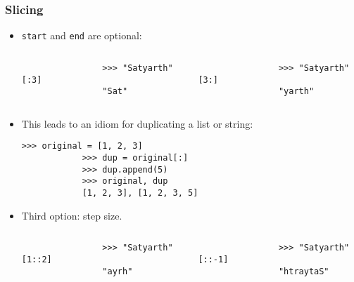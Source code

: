 \documentclass[notes]{beamer}
\begin{document}
	\begin{frame}[fragile]
		\frametitle{Slicing}
		
		\begin{itemize}
			\item \lstinline|start| and \lstinline|end| are optional:
			\begin{columns}[c]
				\begin{lstlisting}
				>>> "Satyarth"[:3]
				"Sat"
				\end{lstlisting}
				\begin{lstlisting}
				>>> "Satyarth"[3:]
				"yarth"
				\end{lstlisting}
			\end{columns}
			
			\pause
			
			\item This leads to an idiom for duplicating a list or string:
			\begin{lstlisting}[xleftmargin=\dimexpr-\leftmargini]
			>>> original = [1, 2, 3]
			>>> dup = original[:]
			>>> dup.append(5)
			>>> original, dup
			[1, 2, 3], [1, 2, 3, 5]
			\end{lstlisting}
			
			\pause
			
			\item Third option: step size.
			
			\begin{columns}[c]
				\begin{lstlisting}
				>>> "Satyarth"[1::2]
				"ayrh"
				\end{lstlisting}
				\begin{lstlisting}
				>>> "Satyarth"[::-1]
				"htraytaS"
				\end{lstlisting}
			\end{columns}
		\end{itemize}
		
	\end{frame}
	
\end{document}
